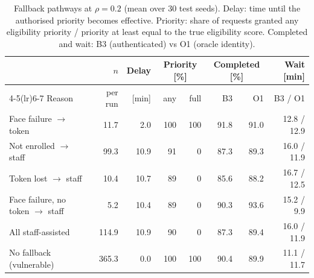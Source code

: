 \begin{table}[!t]
\caption{Fallback pathways at $\rho=0.2$ (mean over 30 test seeds). Delay: time until the authorised priority becomes effective. Priority: share of requests granted any eligibility priority / priority at least equal to the true eligibility score. Completed and wait: B3 (authenticated) vs O1 (oracle identity).}
\label{tabfb}
\centering\footnotesize
\setlength{\tabcolsep}{3pt}
\begin{tabular}{lrrrrrrr}
\toprule
 & $n$ & Delay & \multicolumn{2}{c}{Priority [\%]} & \multicolumn{2}{c}{Completed [\%]} & Wait [min] \\
\cmidrule(lr){4-5}\cmidrule(lr){6-7}
Reason & per run & [min] & any & full & B3 & O1 & B3 / O1 \\
\midrule
Face failure $\rightarrow$ token & 11.7 & 2.0 & 100 & 100 & 91.8 & 91.0 & 12.8 / 12.9 \\
Not enrolled $\rightarrow$ staff & 99.3 & 10.9 & 91 & 0 & 87.3 & 89.3 & 16.0 / 11.9 \\
Token lost $\rightarrow$ staff & 10.4 & 10.7 & 89 & 0 & 85.6 & 88.2 & 16.7 / 12.5 \\
Face failure, no token $\rightarrow$ staff & 5.2 & 10.4 & 89 & 0 & 90.3 & 93.6 & 15.2 / 9.9 \\
All staff-assisted & 114.9 & 10.9 & 90 & 0 & 87.3 & 89.4 & 16.0 / 11.9 \\
No fallback (vulnerable) & 365.3 & 0.0 & 100 & 100 & 90.4 & 89.9 & 11.1 / 11.7 \\
\bottomrule
\end{tabular}
\end{table}
